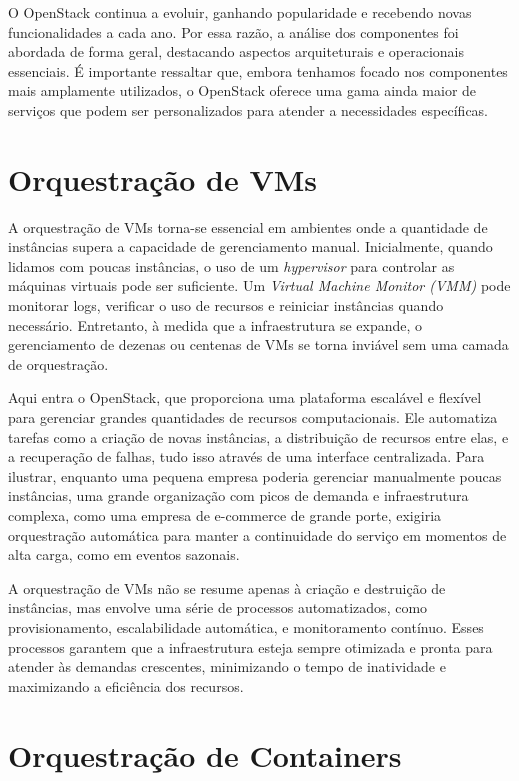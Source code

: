 O OpenStack continua a evoluir, ganhando popularidade e recebendo novas funcionalidades a cada ano. Por essa razão, a análise dos componentes foi abordada de forma geral, destacando aspectos arquiteturais e operacionais essenciais. É importante ressaltar que, embora tenhamos focado nos componentes mais amplamente utilizados, o OpenStack oferece uma gama ainda maior de serviços que podem ser personalizados para atender a necessidades específicas.


\section{Orquestração de VMs}

A orquestração de VMs torna-se essencial em ambientes onde a quantidade de instâncias supera a capacidade de gerenciamento manual. Inicialmente, quando lidamos com poucas instâncias, o uso de um \textit{hypervisor} para controlar as máquinas virtuais pode ser suficiente. Um \textit{Virtual Machine Monitor (VMM)} pode monitorar logs, verificar o uso de recursos e reiniciar instâncias quando necessário. Entretanto, à medida que a infraestrutura se expande, o gerenciamento de dezenas ou centenas de VMs se torna inviável sem uma camada de orquestração.

Aqui entra o OpenStack, que proporciona uma plataforma escalável e flexível para gerenciar grandes quantidades de recursos computacionais. Ele automatiza tarefas como a criação de novas instâncias, a distribuição de recursos entre elas, e a recuperação de falhas, tudo isso através de uma interface centralizada. Para ilustrar, enquanto uma pequena empresa poderia gerenciar manualmente poucas instâncias, uma grande organização com picos de demanda e infraestrutura complexa, como uma empresa de e-commerce de grande porte, exigiria orquestração automática para manter a continuidade do serviço em momentos de alta carga, como em eventos sazonais.

A orquestração de VMs não se resume apenas à criação e destruição de instâncias, mas envolve uma série de processos automatizados, como provisionamento, escalabilidade automática, e monitoramento contínuo. Esses processos garantem que a infraestrutura esteja sempre otimizada e pronta para atender às demandas crescentes, minimizando o tempo de inatividade e maximizando a eficiência dos recursos.

\section{Orquestração de Containers}

